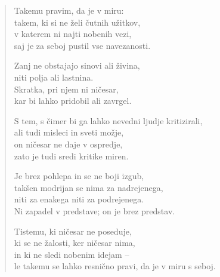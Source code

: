 \begin{verse}
Takemu pravim, da je v miru:\\
takem, ki si ne želi čutnih užitkov,\\
v katerem ni najti nobenih vezi,\\
saj je za seboj pustil vse navezanosti.

Zanj ne obstajajo sinovi ali živina,\\
niti polja ali lastnina.\\
Skratka, pri njem ni ničesar,\\
kar bi lahko pridobil ali zavrgel.

S tem, s čimer bi ga lahko nevedni ljudje kritizirali,\\
ali tudi misleci in sveti možje,\\
on ničesar ne daje v ospredje,\\
zato je tudi sredi kritike miren.

Je brez pohlepa in se ne boji izgub,\\
takšen modrijan se nima za nadrejenega,\\
niti za enakega niti za podrejenega.\\
Ni zapadel v predstave; on je brez predstav.

Tistemu, ki ničesar ne poseduje,\\
ki se ne žalosti, ker ničesar nima,\\
in ki ne sledi nobenim idejam --\\
le takemu se lahko resnično pravi, da je v miru s seboj.

\end{verse}


\clearpage
\begin{verse}


\end{verse}


\clearpage
\begin{verse}


\end{verse}

